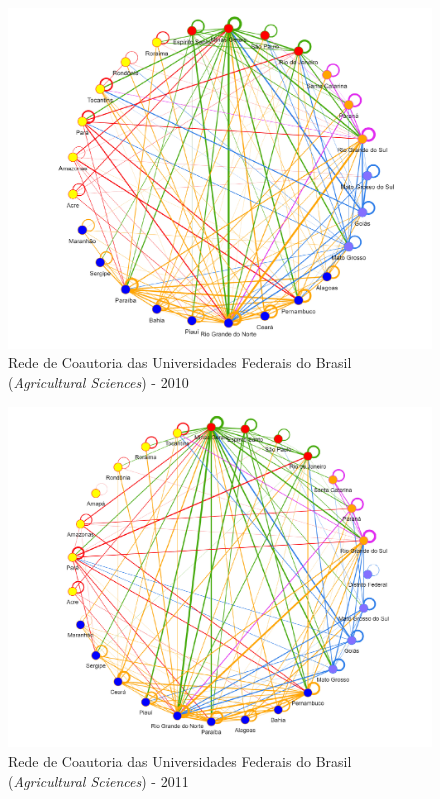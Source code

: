 \begin{figure}
	\centering
	\includegraphics[width=\linewidth]{Imagens/rede-agr-br-2010.pdf}
	\caption{Rede de Coautoria das Universidades Federais do Brasil (\textit{Agricultural Sciences}) - 2010}
	\label{Rede de Coautoria - UF AGRI BR 2010}
\end{figure}

\begin{figure}[H]
	\centering
	\includegraphics[width=\linewidth]{Imagens/rede-agr-br-2011.pdf}
	\caption{Rede de Coautoria das Universidades Federais do Brasil (\textit{Agricultural Sciences}) - 2011}
	\label{Rede de Coautoria - UF AGRI BR 2011}
\end{figure}


